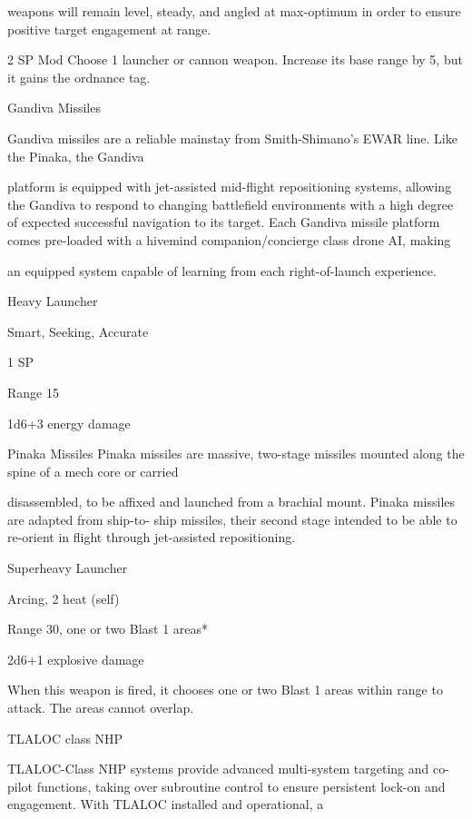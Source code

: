 weapons will remain level, steady, and angled at max-optimum in order to ensure positive target  
engagement at range.   

2 SP  
Mod  
Choose 1 launcher or cannon weapon. Increase its base range by 5, but it gains the ordnance  
tag.
 

Gandiva Missiles  

Gandiva missiles are a reliable mainstay from Smith-Shimano’s EWAR line. Like the Pinaka, the Gandiva  

platform is equipped with jet-assisted mid-flight repositioning systems, allowing the Gandiva to respond to  
changing battlefield environments with a high degree of expected successful navigation to its target. Each  
Gandiva missile platform comes pre-loaded with a hivemind companion/concierge class drone AI, making  

an equipped system capable of learning from each right-of-launch experience.     

Heavy Launcher
 
Smart, Seeking, Accurate
 
1 SP
 
Range 15
 
1d6+3 energy damage
 

Pinaka Missiles  
Pinaka missiles are massive, two-stage missiles mounted along the spine of a mech core or carried  

disassembled, to be affixed and launched from a brachial mount.  Pinaka missiles are adapted from ship-to- 
ship missiles, their second stage intended to be able to re-orient in flight through jet-assisted repositioning.   

Superheavy Launcher
 
Arcing, 2 heat (self)
 

                                                                                                               


Range 30, one or two Blast 1 areas* 
 
2d6+1 explosive damage
 
When this weapon is fired, it chooses one or two Blast 1 areas within range to attack. The areas  
cannot overlap.
 

TLALOC class NHP  

TLALOC-Class NHP systems provide advanced multi-system targeting and co-pilot functions, taking over  
subroutine control to ensure persistent lock-on and engagement. With TLALOC installed and operational, a  

